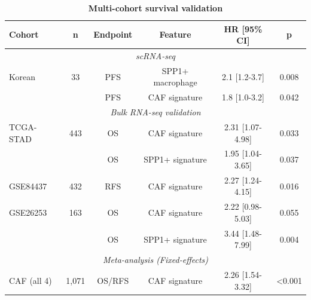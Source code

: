 \documentclass[12pt,twoside]{article}
\begin{document}
\begin{table}[H]
\centering
\caption{\textbf{Multi-cohort survival validation}}
\label{table:3}
\begin{tabular}{l c c c c c}
\toprule
\textbf{Cohort} & \textbf{n} & \textbf{Endpoint} & \textbf{Feature} & \textbf{HR [95\% CI]} & \textbf{p} \\
\midrule
\multicolumn{6}{c}{\textit{scRNA-seq}} \\
Korean & 33 & PFS & SPP1+ macrophage & 2.1 [1.2-3.7] & 0.008 \\
& & PFS & CAF signature & 1.8 [1.0-3.2] & 0.042 \\
\midrule
\multicolumn{6}{c}{\textit{Bulk RNA-seq validation}} \\
TCGA-STAD & 443 & OS & CAF signature & 2.31 [1.07-4.98] & 0.033 \\
& & OS & SPP1+ signature & 1.95 [1.04-3.65] & 0.037 \\
GSE84437 & 432 & RFS & CAF signature & 2.27 [1.24-4.15] & 0.016 \\
GSE26253 & 163 & OS & CAF signature & 2.22 [0.98-5.03] & 0.055 \\
& & OS & SPP1+ signature & 3.44 [1.48-7.99] & 0.004 \\
\midrule
\multicolumn{6}{c}{\textit{Meta-analysis (Fixed-effects)}} \\
CAF (all 4) & 1,071 & OS/RFS & CAF signature & 2.26 [1.54-3.32] & <0.001 \\
\bottomrule
\end{tabular}
\end{table}
\end{document}
